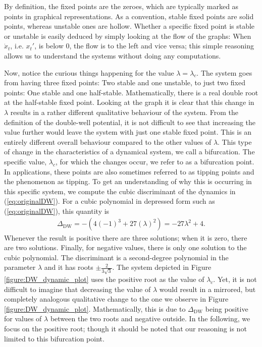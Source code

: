 By definition, the fixed points are the zeroes, which are typically marked as points in graphical representations. As a convention, stable fixed points are solid points, whereas unstable ones are hollow. Whether a specific fixed point is stable or unstable is easily deduced by simply looking at the flow of the graphs: When $\dot{x}_t$, i.e. $x_t'$, is below 0, the flow is to the left and vice versa; this simple reasoning allows us to understand the systems without doing any computations.

Now, notice the curious things happening for the value $\lambda = \lambda_c$. The system goes from having three fixed points: Two stable and one unstable, to just two fixed points: One stable and one half-stable. Mathematically, there is a real double root at the half-stable fixed point. Looking at the graph it is clear that this change in $\lambda$ results in a rather different qualitative behaviour of the system. From the definition of the double-well potential, it is not difficult to see that increasing the value further would leave the system with just one stable fixed point. This is an entirely different overall behaviour compared to the other values of $\lambda$. This type of change in the characteristics of a dynamical system, we call a bifurcation. The specific value, $\lambda_c$, for which the changes occur, we refer to as a bifurcation point.\cite{Strogatz2019_gv} In applications, these points are also sometimes referred to as tipping points and the phenomenon as tipping.
To get an understanding of why this is occurring in this specific system, we compute the cubic discriminant of the dynamics in (\ref{eq:originalDW}). For a cubic polynomial in depressed form such as (\ref{eq:originalDW}), this quantity is
\begin{align}
    \Delta_{\mathrm{DW}} = -\left(4(-1)^3+27\left(\lambda\right)^2\right) = -27\lambda^2 + 4. \label{eq:DW_discriminant}
\end{align} 
Whenever the result is positive there are three solutions; when it is zero, there are two solutions. Finally, for negative values, there is only one solution to the cubic polynomial. The discriminant is a second-degree polynomial in the parameter $\lambda$ and it has roots $\pm \frac{2}{3\sqrt{3}}$. The system depicted in Figure \ref{figure:DW_dynamic_plot} uses the positive root as the value of $\lambda_c$. Yet, it is not difficult to imagine that decreasing the value of $\lambda$ would result in a mirrored, but completely analogous qualitative change to the one we observe in Figure \ref{figure:DW_dynamic_plot}. Mathematically, this is due to $\Delta_{\mathrm{DW}}$ being positive for values of $\lambda$ between the two roots and negative outside. In the following, we focus on the positive root; though it should be noted that our reasoning is not limited to this bifurcation point. \\\\
